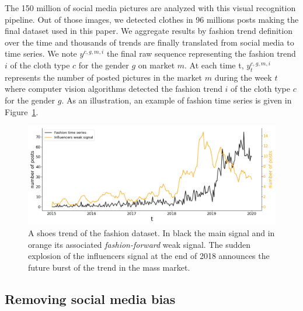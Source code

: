 \documentclass[10pt]{article} %
\begin{document}
The 150 million of social media pictures are analyzed with this visual recognition pipeline. Out of those images, we detected clothes in 96 millions posts making the final dataset used in this paper. We aggregate results by fashion trend definition over the time and  thousands of trends are finally translated from social media to time series. We note $y^{c,g,m,i}$ the final raw sequence representing the fashion trend $i$ of the cloth type $c$ for the gender $g$ on market $m$. At each time t, $y^{c,g,m,i}_t$ represents the number of posted pictures in the market $m$ during the week $t$ where computer vision algorithms detected the fashion trend $i$ of the cloth type $c$ for the gender $g$. As an illustration, an example of fashion time series is given in Figure~\ref{fig:oneemergingtrend}.

\begin{figure}
  \centering
    \includegraphics[width=1.\linewidth]{br_female_shoes_262}
  \caption{A shoes trend of the fashion dataset. In black the main signal and in orange its associated \textit{fashion-forward} weak signal. The sudden explosion of the influencers signal at the end of 2018 announces the future burst of the trend in the mass market.}
\label{fig:oneemergingtrend}
\end{figure}

\subsection{Removing social media bias}
\label{sec:dataset:b}
\end{document}
